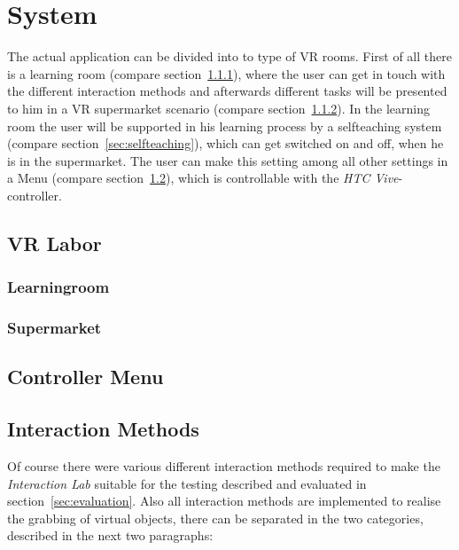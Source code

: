 
\section{System}\label{sec:System}
The actual application can be divided into to type of VR rooms. First of all there is a learning room (compare section~\ref{sec:learningroom}), where the user can get in touch with the different interaction methods and afterwards different tasks will be presented to him in a VR supermarket scenario (compare section~\ref{sec:supermarket}). In the learning room the user will be supported in his learning process by a selfteaching system (compare section~\ref{sec:selfteaching}), which can get switched on and off, when he is in the supermarket. The user can make this setting among all other settings in a Menu  (compare section~\ref{sec:Menu}), which is controllable with the \textit{HTC Vive}-controller. 

\subsection{VR Labor}\label{sec:VRLabor}

\subsubsection{Learningroom} \label{sec:learningroom}
\subsubsection{Supermarket} \label{sec:supermarket}

\subsection{Controller Menu} \label{sec:Menu}

\subsection{Interaction Methods}\label{sec:Interactions}
Of course there were various different interaction methods required to make the \textit{Interaction Lab} suitable for the testing described and evaluated in section~\ref{sec:evaluation}. Also all interaction methods are implemented to realise the grabbing of virtual objects, there can be separated in the two categories, described in the next two paragraphs:

